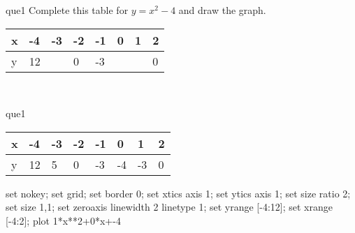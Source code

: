 \documentclass[13.5pt, varwidth=true]{beamer}
\begin{document}
\begin{frame}[shrink=19,fragile]
	\begin{beamercolorbox}[rounded=true, left, shadow=true,wd=14.8cm]{que1}
		 Complete this table for $y = x^{2} - 4$ and draw the graph. \\[0.3cm] \renewcommand{\arraystretch}{1.2}\begin{tabular}{|C|C|C|C|C|C|C|C|} \hline x & -4 & -3 & -2 & -1 & 0 & 1 & 2 \\ \hline y & 12 &  & 0 & -3 &  &  & 0\\ \hline \end{tabular}\\[0.3cm]
	\end{beamercolorbox}
\end{frame}
\begin{frame}[shrink=19,fragile]
	\begin{beamercolorbox}[rounded=true, left, shadow=true,wd=14.8cm]{que1}
		\renewcommand{\arraystretch}{1.2}\begin{tabular}{|C|C|C|C|C|C|C|C|} \hline x & -4 & -3 & -2 & -1 & 0 & 1 & 2 \\ \hline y & 12 & 5 & 0 & -3 & -4 & -3 & 0\\ \hline \end{tabular}\begin{gnuplot}[terminal=pdf] set nokey; set grid; set border 0; set xtics axis 1; set ytics axis 1; set size ratio 2; set size 1,1; set zeroaxis linewidth 2 linetype 1; set yrange [-4:12]; set xrange [-4:2]; plot 1*x**2+0*x+-4 \end{gnuplot}
	\end{beamercolorbox}
\end{frame}
\end{document}
